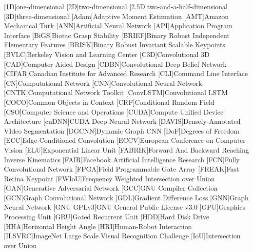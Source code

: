 \begin{acronym}
	[1D]{one-dimensional}
	[2D]{two-dimensional}
	[2.5D]{two-and-a-half-dimensional}
	[3D]{three-dimensional}
	[Adam]{Adaptive Moment Estimation}
	[AMT]{Amazon Mechanical Turk}
	[ANN]{Artificial Neural Network}
    [API]{Application Program Interface}
    [BiGS]{Biotac Grasp Stability}
	[BRIEF]{Binary Robust Independent Elementary Features}
	[BRISK]{Binary Robust Invariant Scalable Keypoints}
    [BVLC]{Berkeley Vision and Learning Center}
    [C3D]{Convolutional 3D}
	[CAD]{Computer Aided Design}
	[CDBN]{Convolutional Deep Belief Network}
	[CIFAR]{Canadian Institute for Advanced Research}
	[CLI]{Command Line Interface}
	[CN]{Computational Network}
	[CNN]{Convolutional Neural Network}
    [CNTK]{Computational Network Toolkit}
    [ConvLSTM]{Convolutional LSTM}
    [COCO]{Common Objects in Context}
    [CRF]{Conditional Random Field}
	[CSO]{Computer Science and Operations}
	[CUDA]{Compute Unified Device Architecture}
    [cuDNN]{CUDA Deep Neural Network}
    [DAVIS]{Densely-Annotated VIdeo Segmentation}
    [DGCNN]{Dynamic Graph CNN}
    [DoF]{Degrees of Freedom}
    [ECC]{Edge-Conditioned Convolution}
    [ECCV]{European Conference on Computer Vision}
    [ELU]{Exponential Linear Unit}
    [FABRIK]{Forward And Backward Reaching Inverse Kinematics}
    [FAIR]{Facebook Artificial Intelligence Research}
    [FCN]{Fully Convolutional Network}
    [FPGA]{Field Programmable Gate Array}
    [FREAK]{Fast Retina Keypoint}
    [FWIoU]{Frequency Weighted Intersection over Union}
    [GAN]{Generative Adversarial Network}
    [GCC]{GNU Compiler Collection}
    [GCN]{Graph Convolutional Network}
    [GDL]{Gradient Difference Loss}
    [GNN]{Graph Neural Network}
	[GNU GPLv3]{GNU General Public License v3.0}
    [GPU]{Graphics Processing Unit}
    [GRU]{Gated Recurrent Unit}
    [HDD]{Hard Disk Drive}
    [HHA]{Horizontal Height Angle}
    [HRI]{Human-Robot Interaction}
    [ILSVRC]{ImageNet Large Scale Visual Recognition Challenge}
    [IoU]{Intersection over Union}

\end{acronym}
